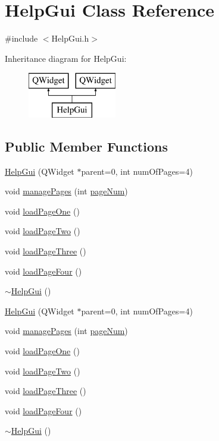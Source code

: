 \hypertarget{class_help_gui}{\section{Help\-Gui Class Reference}
\label{class_help_gui}
}


{\ttfamily \#include $<$Help\-Gui.\-h$>$}

Inheritance diagram for Help\-Gui\-:\begin{figure}[H]
\begin{center}
\leavevmode
\includegraphics[height=2.000000cm]{class_help_gui}
\end{center}
\end{figure}
\subsection*{Public Member Functions}
\begin{DoxyCompactItemize}
\item 
\hyperlink{class_help_gui_a9c7988a6151feb8821875ad4bc61472a}{Help\-Gui} (Q\-Widget $\ast$parent=0, int num\-Of\-Pages=4)
\item 
void \hyperlink{class_help_gui_a7b1d7de5926a7c523999360a159fbf7d}{manage\-Pages} (int \hyperlink{class_help_gui_adf3a3c855433b0f1a91539782a22cc23}{page\-Num})
\item 
void \hyperlink{class_help_gui_af3d15db537d9ac9e4e6925f2a3703b1a}{load\-Page\-One} ()
\item 
void \hyperlink{class_help_gui_a1cf07fa452e8d2c0afb95067d085e2f2}{load\-Page\-Two} ()
\item 
void \hyperlink{class_help_gui_a649b7357d88c0afcd6b5323a39a3a26a}{load\-Page\-Three} ()
\item 
void \hyperlink{class_help_gui_a8a416f85a4d441fc6447b283911654d5}{load\-Page\-Four} ()
\item 
\hyperlink{class_help_gui_aabe643ccd14d1b2f7e177190d12c4dbf}{$\sim$\-Help\-Gui} ()
\item 
\hyperlink{class_help_gui_a9c7988a6151feb8821875ad4bc61472a}{Help\-Gui} (Q\-Widget $\ast$parent=0, int num\-Of\-Pages=4)
\item 
void \hyperlink{class_help_gui_a7b1d7de5926a7c523999360a159fbf7d}{manage\-Pages} (int \hyperlink{class_help_gui_adf3a3c855433b0f1a91539782a22cc23}{page\-Num})
\item 
void \hyperlink{class_help_gui_af3d15db537d9ac9e4e6925f2a3703b1a}{load\-Page\-One} ()
\item 
void \hyperlink{class_help_gui_a1cf07fa452e8d2c0afb95067d085e2f2}{load\-Page\-Two} ()
\item 
void \hyperlink{class_help_gui_a649b7357d88c0afcd6b5323a39a3a26a}{load\-Page\-Three} ()
\item 
void \hyperlink{class_help_gui_a8a416f85a4d441fc6447b283911654d5}{load\-Page\-Four} ()
\item 
\hyperlink{class_help_gui_aabe643ccd14d1b2f7e177190d12c4dbf}{$\sim$\-Help\-Gui} ()
\end{DoxyCompactItemize}
